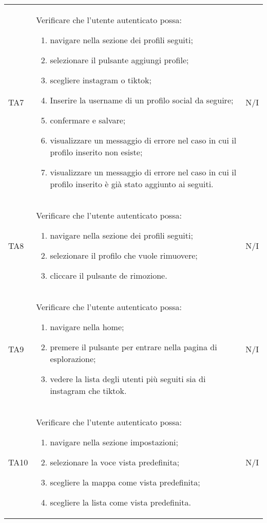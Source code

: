 {\begin{longtable}{C{.1\freewidth} C{.80\freewidth} C{.1\freewidth}}
    TA7 & Verificare che l'utente autenticato possa:\begin{enumerate}
        \item navigare nella sezione dei profili seguiti;
        \item selezionare il pulsante aggiungi profile;
        \item scegliere instagram o tiktok;
        \item Inserire la username di un profilo social da seguire;
        \item confermare e salvare;
        \item visualizzare un messaggio di errore nel caso in cui il profilo inserito non esiste;
        \item visualizzare un messaggio di errore nel caso in cui il profilo inserito è già stato aggiunto ai seguiti.
    \end{enumerate} & N/I  \\

    TA8 & Verificare che l'utente autenticato possa:\begin{enumerate}
        \item navigare nella sezione dei profili seguiti;
        \item selezionare il profilo che vuole rimuovere;
        \item cliccare il pulsante de rimozione.
    \end{enumerate} & N/I  \\

    TA9 & Verificare che l'utente autenticato possa:\begin{enumerate}
        \item navigare nella home;
        \item premere il pulsante per entrare nella pagina di esplorazione;
        \item vedere la lista degli utenti più seguiti sia di instagram che tiktok.
    \end{enumerate} & N/I  \\

    TA10 & Verificare che l'utente autenticato possa:\begin{enumerate}
        \item navigare nella sezione impostazioni;
        \item selezionare la voce vista predefinita;
        \item scegliere la mappa come vista predefinita;
        \item scegliere la lista come vista predefinita.
    \end{enumerate} & N/I \\

\bottomrule
\end{longtable}
} 

